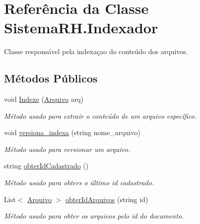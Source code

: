 \hypertarget{class_sistema_r_h_1_1_indexador}{
\section{Referência da Classe SistemaRH.Indexador}
\label{class_sistema_r_h_1_1_indexador}
}


Classe responsável pela indexaçao do conteúdo dos arquivos.  


\subsection*{Métodos Públicos}
\begin{DoxyCompactItemize}
\item 
void \hyperlink{class_sistema_r_h_1_1_indexador_a12ce2dc36bf68b79181bfa7c4912f949}{Indexe} (\hyperlink{class_sistema_r_h_1_1_arquivo}{Arquivo} arq)
\begin{DoxyCompactList}\small\item\em Método usado para extrair o conteúdo de um arquivo específico. \item\end{DoxyCompactList}\item 
void \hyperlink{class_sistema_r_h_1_1_indexador_a4eef3e11109c72d0827d78b517e47fa6}{versiona\_\-indexa} (string nome\_\-arquivo)
\begin{DoxyCompactList}\small\item\em Método usado para versionar um arquivo. \item\end{DoxyCompactList}\item 
string \hyperlink{class_sistema_r_h_1_1_indexador_a147adebfe868bc4495d0181aedc04ac8}{obterIdCadastrado} ()
\begin{DoxyCompactList}\small\item\em Método usado para obters o último id cadastrado. \item\end{DoxyCompactList}\item 
List$<$ \hyperlink{class_sistema_r_h_1_1_arquivo}{Arquivo} $>$ \hyperlink{class_sistema_r_h_1_1_indexador_a626f7c79c8bd67eec7541529c4d0e3ea}{obterIdArquivos} (string id)
\begin{DoxyCompactList}\small\item\em Método usado para obter os arquivos pelo id do documento. \item\end{DoxyCompactList}\end{DoxyCompactItemize}


